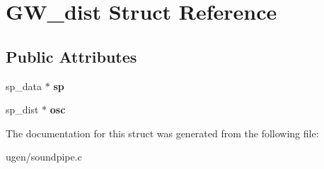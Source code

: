 \hypertarget{structGW__dist}{}\section{G\+W\+\_\+dist Struct Reference}
\label{structGW__dist}
\subsection*{Public Attributes}
\begin{DoxyCompactItemize}
\item 
\hypertarget{structGW__dist_a52626d3c97f240fd8d4b5c1ec0fd56b2}{}\label{structGW__dist_a52626d3c97f240fd8d4b5c1ec0fd56b2} 
sp\+\_\+data $\ast$ {\bfseries sp}
\item 
\hypertarget{structGW__dist_a0e0144d14308ddf435a3e9942a4b5aa3}{}\label{structGW__dist_a0e0144d14308ddf435a3e9942a4b5aa3} 
sp\+\_\+dist $\ast$ {\bfseries osc}
\end{DoxyCompactItemize}


The documentation for this struct was generated from the following file\+:\begin{DoxyCompactItemize}
\item 
ugen/soundpipe.\+c\end{DoxyCompactItemize}
